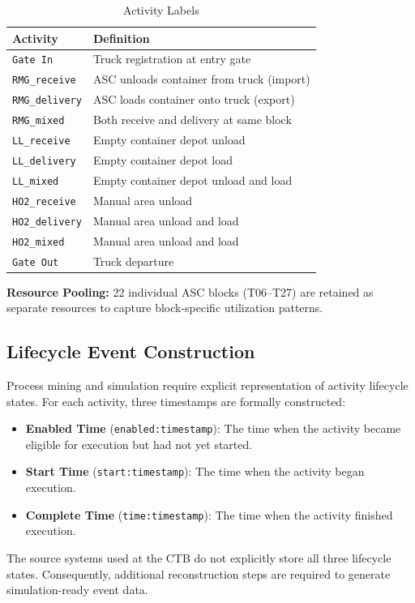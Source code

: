     \begin{table}[h]
    \centering
    \caption{Activity Labels}
    \label{tab:activities}
    \begin{tabular}{ll}
    \toprule
    \textbf{Activity} & \textbf{Definition} \\
    \midrule
    \texttt{Gate In} & Truck registration at entry gate \\
    \texttt{RMG\_receive} & ASC unloads container from truck (import) \\
    \texttt{RMG\_delivery} & ASC loads container onto truck (export) \\
    \texttt{RMG\_mixed} & Both receive and delivery at same block \\
    \texttt{LL\_receive} & Empty container depot unload \\
    \texttt{LL\_delivery} & Empty container depot load \\
    \texttt{LL\_mixed} & Empty container depot unload and load \\
    \texttt{HO2\_receive} & Manual area unload \\
    \texttt{HO2\_delivery} & Manual area unload and load \\
    \texttt{HO2\_mixed} & Manual area unload and load \\
    \texttt{Gate Out} & Truck departure \\
    \bottomrule
    \end{tabular}
    \end{table}
    
    \textbf{Resource Pooling:} 22 individual ASC blocks (T06--T27) are retained as separate resources to capture block-specific utilization patterns.
    \subsection{Lifecycle Event Construction}
    Process mining and simulation require explicit representation of activity lifecycle states. For each activity, three timestamps are formally constructed:
    
    \begin{itemize}
        \item \textbf{Enabled Time} (\texttt{enabled:timestamp}): The time when the activity became eligible for execution but had not yet started.
        \item \textbf{Start Time} (\texttt{start:timestamp}): The time when the activity began execution.
        \item \textbf{Complete Time} (\texttt{time:timestamp}): The time when the activity finished execution.
    \end{itemize}
    The source systems used at the CTB do not explicitly store all three lifecycle states. Consequently, additional reconstruction steps are required to generate simulation-ready event data.
    
